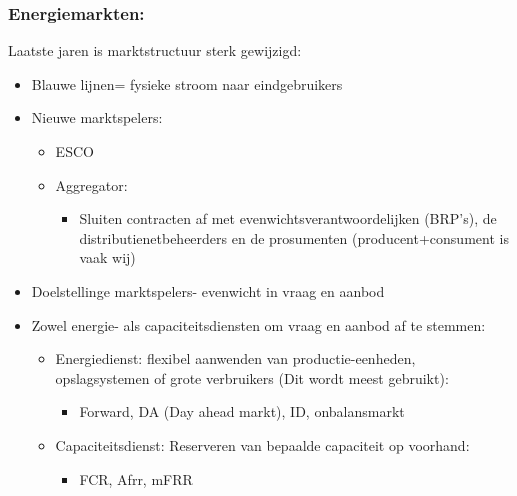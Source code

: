 \documentclass[12pt]{article}
\begin{document}
\subsubsection{Energiemarkten:}
Laatste jaren is marktstructuur sterk gewijzigd:\begin{itemize}
    \item Blauwe lijnen= fysieke stroom naar eindgebruikers
    \item Nieuwe marktspelers:\begin{itemize}
        \item ESCO
        \item Aggregator:\begin{itemize}
            \item Sluiten contracten af met evenwichtsverantwoordelijken (BRP's), de distributienetbeheerders en de prosumenten (producent+consument is vaak wij)
        \end{itemize}
    \end{itemize}
    \item Doelstellinge marktspelers- evenwicht in vraag en aanbod 
    \item Zowel energie- als capaciteitsdiensten om vraag en aanbod af te stemmen:\begin{itemize}
        \item Energiedienst: flexibel aanwenden van productie-eenheden, opslagsystemen of grote verbruikers (Dit wordt meest gebruikt):\begin{itemize}
            \item Forward, DA (Day ahead markt), ID, onbalansmarkt
        \end{itemize}
        \item Capaciteitsdienst: Reserveren van bepaalde capaciteit op voorhand:\begin{itemize}
            \item FCR, Afrr, mFRR
        \end{itemize}
    \end{itemize}
\end{itemize}
\end{document}
